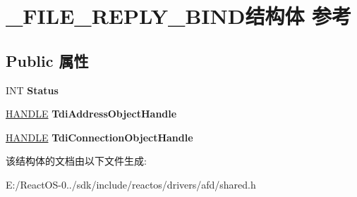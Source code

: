 \hypertarget{struct___f_i_l_e___r_e_p_l_y___b_i_n_d}{}\section{\+\_\+\+F\+I\+L\+E\+\_\+\+R\+E\+P\+L\+Y\+\_\+\+B\+I\+N\+D结构体 参考}
\label{struct___f_i_l_e___r_e_p_l_y___b_i_n_d}
\subsection*{Public 属性}
\begin{DoxyCompactItemize}
\item 
\mbox{\label{struct___f_i_l_e___r_e_p_l_y___b_i_n_d_afc30a39543e06e150b222e3219ad682b}} 
I\+NT {\bfseries Status}
\item 
\mbox{\label{struct___f_i_l_e___r_e_p_l_y___b_i_n_d_ac840ca00e652d3094651b80c7c49c526}} 
\hyperlink{interfacevoid}{H\+A\+N\+D\+LE} {\bfseries Tdi\+Address\+Object\+Handle}
\item 
\mbox{\label{struct___f_i_l_e___r_e_p_l_y___b_i_n_d_a9a63cf926c03f161c734278e84857d66}} 
\hyperlink{interfacevoid}{H\+A\+N\+D\+LE} {\bfseries Tdi\+Connection\+Object\+Handle}
\end{DoxyCompactItemize}


该结构体的文档由以下文件生成\+:\begin{DoxyCompactItemize}
\item 
E\+:/\+React\+O\+S-\/0../sdk/include/reactos/drivers/afd/shared.\+h\end{DoxyCompactItemize}
